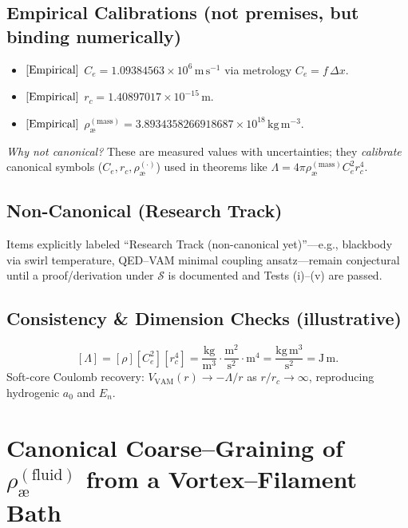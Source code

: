 \documentclass[11pt, a4paper]{article}
\begin{document}
    \subsection*{Empirical Calibrations (not premises, but binding numerically)}
    \begin{itemize}
        \item \([{\rm Empirical}]\) \(C_e = 1.09384563\times 10^6\,\mathrm{m\,s^{-1}}\) via metrology \(C_e=f\,\Delta x\).
        \item \([{\rm Empirical}]\) \(r_c = 1.40897017\times 10^{-15}\,\mathrm{m}\).
        \item \([{\rm Empirical}]\) \(\rho_{\text{\ae}}^{(\text{mass})} = 3.8934358266918687\times 10^{18}\,\mathrm{kg\,m^{-3}}\).
    \end{itemize}
    \emph{Why not canonical?} These are measured values with uncertainties; they \emph{calibrate} canonical symbols (\(C_e,r_c,\rho_{\text{\ae}}^{(\cdot)}\)) used in theorems like \(\Lambda=4\pi\rho_{\text{\ae}}^{(\text{mass})}C_e^2 r_c^4\).

    \subsection*{Non-Canonical (Research Track)}
    Items explicitly labeled “Research Track (non-canonical yet)”—e.g., blackbody via swirl temperature, QED–VAM minimal coupling ansatz—remain conjectural until a proof/derivation under \(\mathcal{S}\) is documented and Tests (i)–(v) are passed.

    \subsection*{Consistency & Dimension Checks (illustrative)}
    \[
        [\Lambda]=[\rho][C_e^2][r_c^4]
        =\frac{\mathrm{kg}}{\mathrm{m^3}}\cdot\frac{\mathrm{m^2}}{\mathrm{s^2}}\cdot\mathrm{m^4}
        =\frac{\mathrm{kg\,m^3}}{\mathrm{s^2}}
        =\mathrm{J\,m}.
    \]
    Soft-core Coulomb recovery: \(V_{\text{VAM}}(r)\to -\Lambda/r\) as \(r/r_c\to\infty\), reproducing hydrogenic \(a_0\) and \(E_n\). \cite{Schrodinger1926,Jackson1999}




\section{Canonical Coarse–Graining of \(\rho_{\text{\ae}}^{(\text{fluid})}\) from a Vortex–Filament Bath}
\label{sec:canon_rhoae_from_filaments}
\end{document}
